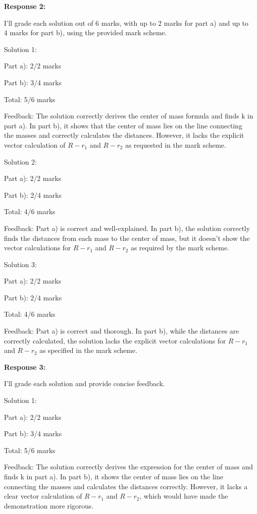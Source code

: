 \documentclass[a4paper,11pt]{article}
\begin{document}
\bigskip
\textbf{Response 2:}

I'll grade each solution out of 6 marks, with up to 2 marks for part a) and up to 4 marks for part b), using the provided mark scheme.

Solution 1:

Part a): 2/2 marks

Part b): 3/4 marks

Total: 5/6 marks

Feedback: The solution correctly derives the center of mass formula and finds k in part a). In part b), it shows that the center of mass lies on the line connecting the masses and correctly calculates the distances. However, it lacks the explicit vector calculation of \(R - r_1\) and \(R - r_2\) as requested in the mark scheme.

Solution 2:

Part a): 2/2 marks

Part b): 2/4 marks

Total: 4/6 marks

Feedback: Part a) is correct and well-explained. In part b), the solution correctly finds the distances from each mass to the center of mass, but it doesn't show the vector calculations for \(R - r_1\) and \(R - r_2\) as required by the mark scheme.

Solution 3:

Part a): 2/2 marks

Part b): 2/4 marks

Total: 4/6 marks

Feedback: Part a) is correct and thorough. In part b), while the distances are correctly calculated, the solution lacks the explicit vector calculations for \(R - r_1\) and \(R - r_2\) as specified in the mark scheme.

\bigskip
\textbf{Response 3:}

I'll grade each solution and provide concise feedback.

Solution 1:

Part a): 2/2 marks

Part b): 3/4 marks

Total: 5/6 marks

Feedback: The solution correctly derives the expression for the center of mass and finds k in part a). In part b), it shows the center of mass lies on the line connecting the masses and calculates the distances correctly. However, it lacks a clear vector calculation of \(R - r_1\) and \(R - r_2\), which would have made the demonstration more rigorous.
\end{document}
